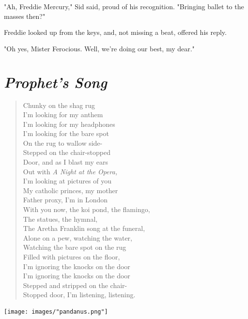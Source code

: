 \documentclass[
]{memoir}
\begin{document}
"Ah, Freddie Mercury," Sid said, proud of his recognition. "Bringing
ballet to the masses then?"

Freddie looked up from the keys, and, not missing a beat, offered his
reply.

"Oh yes, Mister Ferocious. Well, we're doing our best, my dear."

\hypertarget{prophets-song}{%
\section*{\texorpdfstring{\emph{Prophet's
Song}}{Prophet's Song}}\label{prophets-song}}

\begin{verse}
Chunky on the shag rug\\
I'm looking for my anthem\\
I'm looking for my headphones\\
I'm looking for the bare spot\\
On the rug to wallow side-\\
Stepped on the chair-stopped\\
Door, and as I blast my ears\\
Out with \emph{A Night at the Opera,}\\
I'm looking at pictures of you\\
My catholic princes, my mother\\
Father proxy, I'm in London\\
With you now, the koi pond, the flamingo,\\
The statues, the hymnal,\\
The Aretha Franklin song at the funeral,\\
Alone on a pew, watching the water,\\
Watching the bare spot on the rug\\
Filled with pictures on the floor,\\
I'm ignoring the knocks on the door\\
I'm ignoring the knocks on the door\\
Stepped and stripped on the chair-\\
Stopped door, I'm listening, listening.\\
\end{verse}

\begin{center}\texttt{[image: images/"pandanus.png"]}\end{center}
\end{document}
